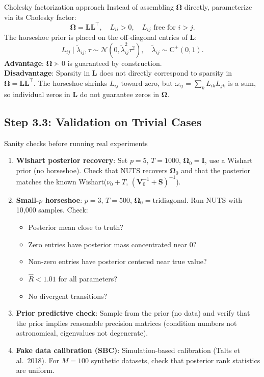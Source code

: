 \documentclass[11pt,a4paper]{article}
\newcommand{\Normal}{\mathcal{N}}
\newcommand{\HalfCauchy}{\mathrm{C}^{+}}
\newcommand{\bOmega}{\bm{\Omega}}
\begin{document}
\begin{mathbox}{Cholesky factorization approach}
Instead of assembling $\bOmega$ directly, parameterize via its Cholesky factor:
\begin{equation}
  \bOmega = \bm{L}\bm{L}^\top, \quad L_{ii} > 0, \quad L_{ij} \text{ free for } i > j.
\end{equation}
The horseshoe prior is placed on the off-diagonal entries of $\bm{L}$:
\begin{equation}
  L_{ij} \mid \tilde\lambda_{ij}, \tau \sim \Normal(0, \tilde\lambda_{ij}^2 \tau^2), \quad \tilde\lambda_{ij} \sim \HalfCauchy(0,1).
\end{equation}
\textbf{Advantage}: $\bOmega \succ 0$ is guaranteed by construction.\\
\textbf{Disadvantage}: Sparsity in $\bm{L}$ does not directly correspond to sparsity in $\bOmega = \bm{L}\bm{L}^\top$. The horseshoe shrinks $L_{ij}$ toward zero, but $\omega_{ij} = \sum_k L_{ik}L_{jk}$ is a sum, so individual zeros in $\bm{L}$ do not guarantee zeros in $\bOmega$.
\end{mathbox}

\subsection{Step 3.3: Validation on Trivial Cases}

\begin{action}{Sanity checks before running real experiments}
\begin{enumerate}
  \item \textbf{Wishart posterior recovery}: Set $p=5$, $T=1000$, $\bOmega_0 = \bm{I}$, use a Wishart prior (no horseshoe). Check that NUTS recovers $\bOmega_0$ and that the posterior matches the known Wishart($\nu_0 + T$, $(\bm{V}_0^{-1} + \bm{S})^{-1}$).
  \item \textbf{Small-$p$ horseshoe}: $p=3$, $T=500$, $\bOmega_0 = \text{tridiagonal}$. Run NUTS with 10,000 samples. Check:
  \begin{itemize}[nosep]
    \item Posterior mean close to truth?
    \item Zero entries have posterior mass concentrated near 0?
    \item Non-zero entries have posterior centered near true value?
    \item $\hat{R} < 1.01$ for all parameters?
    \item No divergent transitions?
  \end{itemize}
  \item \textbf{Prior predictive check}: Sample from the prior (no data) and verify that the prior implies reasonable precision matrices (condition numbers not astronomical, eigenvalues not degenerate).
  \item \textbf{Fake data calibration (SBC)}: Simulation-based calibration (Talts et al.\ 2018). For $M=100$ synthetic datasets, check that posterior rank statistics are uniform.
\end{enumerate}
\end{action}
\end{document}
